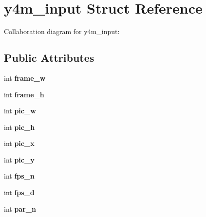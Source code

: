 \hypertarget{structy4m__input}{\section{y4m\+\_\+input Struct Reference}
\label{structy4m__input}
}


Collaboration diagram for y4m\+\_\+input\+:
\subsection*{Public Attributes}
\begin{DoxyCompactItemize}
\item 
\hypertarget{structy4m__input_af2a9987527c304e1b3e56beef51a8b61}{int {\bfseries frame\+\_\+w}}\label{structy4m__input_af2a9987527c304e1b3e56beef51a8b61}

\item 
\hypertarget{structy4m__input_aa68d4ee2db3c633119fac30101cdca72}{int {\bfseries frame\+\_\+h}}\label{structy4m__input_aa68d4ee2db3c633119fac30101cdca72}

\item 
\hypertarget{structy4m__input_aa6c7e8b4f22b38c29b9d658c3fddb974}{int {\bfseries pic\+\_\+w}}\label{structy4m__input_aa6c7e8b4f22b38c29b9d658c3fddb974}

\item 
\hypertarget{structy4m__input_a32b35fc464c0c6bdd8326151bdd4a581}{int {\bfseries pic\+\_\+h}}\label{structy4m__input_a32b35fc464c0c6bdd8326151bdd4a581}

\item 
\hypertarget{structy4m__input_a1830eacfb4cf3683e0e08946d025678d}{int {\bfseries pic\+\_\+x}}\label{structy4m__input_a1830eacfb4cf3683e0e08946d025678d}

\item 
\hypertarget{structy4m__input_a226e38990d72f3168ac6cdae1908d0a8}{int {\bfseries pic\+\_\+y}}\label{structy4m__input_a226e38990d72f3168ac6cdae1908d0a8}

\item 
\hypertarget{structy4m__input_ae23eb782e196a405eb252a48ad37413d}{int {\bfseries fps\+\_\+n}}\label{structy4m__input_ae23eb782e196a405eb252a48ad37413d}

\item 
\hypertarget{structy4m__input_aaff5bba2fd45854d1aeb1a513f4e38b9}{int {\bfseries fps\+\_\+d}}\label{structy4m__input_aaff5bba2fd45854d1aeb1a513f4e38b9}

\item 
\hypertarget{structy4m__input_a4025c837ee53128981fd757c91c4c87f}{int {\bfseries par\+\_\+n}}\label{structy4m__input_a4025c837ee53128981fd757c91c4c87f}


\end{DoxyCompactItemize}
